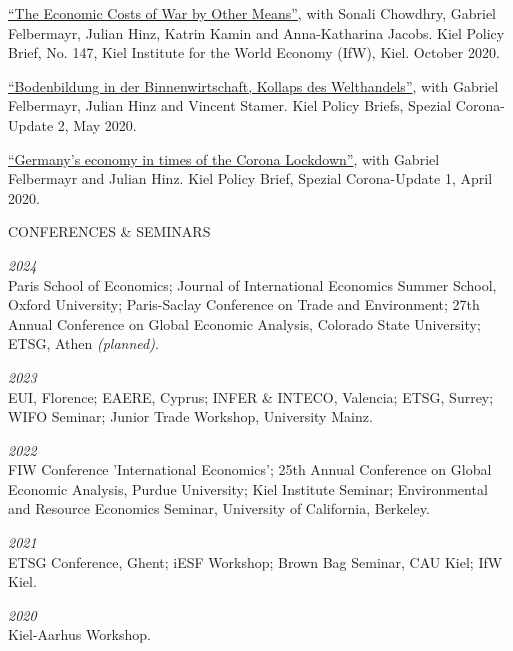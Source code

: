 \documentclass{article}
\begin{document}
\begin{minipage}[t]{0.12\textwidth}
\hspace{0mm}
\end{minipage}
\hspace{5mm}
\begin{minipage}[t]{0.8\textwidth}
    \href{https://www.ifw-kiel.de/publications/kiel-policy-briefs/2020/the-economic-costs-of-war-by-other-means-15301/}{``The Economic Costs of War by Other Means''}, with Sonali Chowdhry, Gabriel Felbermayr, Julian Hinz, Katrin Kamin and Anna-Katharina Jacobs. Kiel Policy Brief, No. 147, Kiel Institute for the World Economy (IfW), Kiel. October 2020. \par
    \href{https://www.ifw-kiel.de/de/publikationen/kiel-policy-briefs/spezial/bodenbildung-in-der-binnenwirtschaft-kollaps-des-welthandels-14242/}{``Bodenbildung in der Binnenwirtschaft, Kollaps des Welthandels''}, with Gabriel Felbermayr, Julian Hinz and Vincent Stamer. Kiel Policy Briefs, Spezial Corona-Update 2, May 2020. \par
    \href{https://www.ifw-kiel.de/publications/kiel-policy-briefs/special-edition/germanys-economy-in-times-of-the-corona-lockdown-14127/}{``Germany’s economy in times of the Corona Lockdown''}, with Gabriel Felbermayr and Julian Hinz. Kiel Policy Brief, Spezial Corona-Update 1, April 2020.
\end{minipage}
\medskip


\begin{minipage}[t]{0.12\textwidth}
    {\selectfont CONFERENCES \& SEMINARS} \\
\end{minipage}
\hspace{5mm}
\begin{minipage}[t]{0.8\textwidth}
    \textit{2024} \\
    Paris School of Economics; Journal of International Economics Summer School, Oxford University; Paris-Saclay Conference on Trade and Environment; 27th Annual Conference on Global Economic Analysis, Colorado State University; ETSG, Athen \textit{(planned)}. \par
    \textit{2023} \\
    EUI, Florence; EAERE, Cyprus; INFER \& INTECO, Valencia; ETSG, Surrey; WIFO Seminar; Junior Trade Workshop, University Mainz. \par
    \textit{2022} \\
    FIW Conference 'International Economics'; 25th Annual Conference on Global Economic Analysis, Purdue University; Kiel Institute Seminar; Environmental and Resource Economics Seminar, University of California, Berkeley.  \par
    \textit{2021} \\
    ETSG Conference, Ghent; iESF Workshop; Brown Bag Seminar, CAU Kiel; IfW Kiel. \par
    \textit{2020} \\
    Kiel-Aarhus Workshop. \par
\end{minipage}
\medskip
\end{document}
